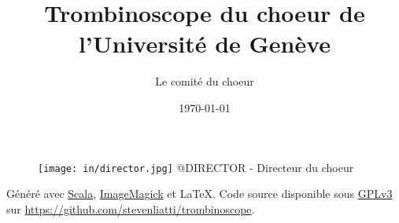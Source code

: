 \documentclass{article}
\begin{document}
\title{Trombinoscope du choeur de l'Université de Genève}
\author{Le comité du choeur}
\date{\today}
\maketitle

\begin{figure}[h!]
    \begin{center}
        \texttt{[image: in/director.jpg]}
        @DIRECTOR - Directeur du choeur
    \end{center}
\end{figure}

\newpage



\newpage

\pagebreak
\hspace{0pt}
\vfill
\begin{center}
    \Large{Généré avec \href{https://www.scala-lang.org/}{Scala}, \href{https://imagemagick.org/}{ImageMagick} et \LaTeX.}
    \bigbreak
    \Large{Code source disponible sous \href{https://www.gnu.org/licenses/gpl-3.0.fr.html}{GPLv3} sur \url{https://github.com/stevenliatti/trombinoscope}.}
\end{center}
\vfill
\hspace{0pt}
\pagebreak
\end{document}
